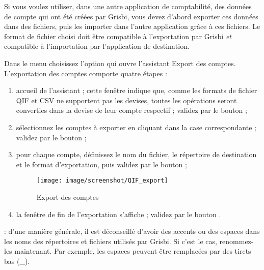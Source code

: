 Si vous voulez utiliser, dans une autre application de comptabilité, des données de compte qui ont été créées par Grisbi, vous devez d'abord exporter ces données dans des fichiers, puis les importer dans l'autre application grâce à ces fichiers. Le format de fichier choisi doit être compatible à l'exportation par Grisbi \emph{et} compatible à l'importation par l'application de destination.
 
Dans le menu  choisissez l'option  qui ouvre l'assistant Export des comptes. L'exportation des comptes comporte quatre étapes :

\begin{enumerate}
	\item accueil de l'assistant ; cette fenêtre indique que, comme les formats de fichier QIF et CSV ne supportent pas les devises, toutes les opérations seront converties dans la devise de leur compte respectif ; validez par le bouton  ;
	\item sélectionnez les comptes à exporter en cliquant dans la case correspondante ; validez par le bouton  ;
	\item pour chaque compte, définissez le nom du fichier, le répertoire de destination et le format d'exportation, puis validez par le bouton   ;
	\begin{figure}[t]
	\begin{center}
	\texttt{[image: image/screenshot/QIF\_export]}
	\end{center}
	\caption{Export des comptes}
	\label{QIF-export-img}
	\end{figure}
	
	\item la fenêtre de fin de l'exportation s'affiche ; validez par le bouton .
\end{enumerate}

\Attention{}: d'une manière générale, il est déconseillé d'avoir des accents ou des espaces dans les noms des répertoires et fichiers utilisés par Grisbi. Si c'est le cas, renommez-les maintenant. Par exemple, les espaces peuvent être remplacées par des tirets bas (\_).











